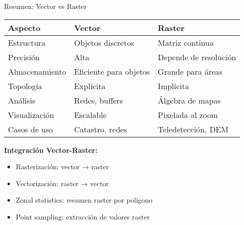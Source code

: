 \documentclass[10pt]{beamer}
\begin{document}
\begin{frame}{Resumen: Vector vs Raster}
    \begin{table}
        \footnotesize
        \begin{tabular}{lll}
        \toprule
        \textbf{Aspecto} & \textbf{Vector} & \textbf{Raster} \\
        \midrule
        Estructura & Objetos discretos & Matriz continua \\
        Precisión & Alta & Depende de resolución \\
        Almacenamiento & Eficiente para objetos & Grande para áreas \\
        Topología & Explícita & Implícita \\
        Análisis & Redes, buffers & Álgebra de mapas \\
        Visualización & Escalable & Pixelada al zoom \\
        Casos de uso & Catastro, redes & Teledetección, DEM \\
        \bottomrule
        \end{tabular}
    \end{table}
    
    \vspace{0.5cm}
    
    \begin{tcolorbox}[colframe=usachblue,colback=blue!5]
        \textbf{Integración Vector-Raster:}
        \begin{itemize}
            \item Rasterización: vector → raster
            \item Vectorización: raster → vector
            \item Zonal statistics: resumen raster por polígono
            \item Point sampling: extracción de valores raster
        \end{itemize}
    \end{tcolorbox}
\end{frame}
\end{document}
